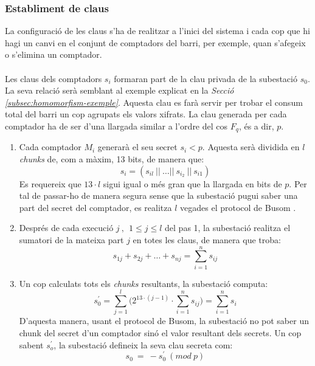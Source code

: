 \documentclass{article}
\begin{document}
\subsubsection{Establiment de claus}\label{section:ks}
La configuració de les claus s'ha de realitzar a l'inici del sistema i cada cop que hi hagi un canvi en el conjunt de comptadors del barri, per exemple, quan s'afegeix o s'elimina un comptador.
\\
\\
Les claus dels comptadors $s_i$ formaran part de la clau privada de la subestació $s_0$. La seva relació serà semblant al exemple explicat en la \textit{Secció \ref{subsec:homomorfism-exemple}}. Aquesta clau es farà servir per trobar el consum total del barri un cop agrupats els valors xifrats.
La clau generada per cada comptador ha de ser d'una llargada similar a l'ordre del cos $F_q$, és a dir, $p$.
\begin{enumerate}
	\item Cada comptador $M_i$ generarà el seu secret $s_i < p$. Aquesta serà dividida en $l$ \textit{chunks} de, com a màxim, 13 bits, de manera que:
	\[s_i = (s_{il}\ ||\ \dots ||\ s_{i_2}\ ||\ s_{i1})\]
	Es requereix que $13 \cdot l$ sigui igual o més gran que la llargada en bits de $p$. Per tal de passar-ho de manera segura sense que la subestació pugui saber una part del secret del comptador, es realitza  $l$ vegades el protocol de Busom \cite{busom}.
	\item Després de cada execució $j \ , \ \ 1 \le j \le l$ del pas 1, la subestació realitza el sumatori de la mateixa part $j$ en totes les claus, de manera que troba:
	\[s_{1j} + s_{2j} + \dots + s_{nj} = \sum_{i=1}^{n} s_{ij}\]
	\item Un cop calculats tots els \textit{chunks} resultants, la subestació computa:
	\[s_0^{'} = \sum_{j=1}^{l} \Big( 2^{13 \cdot (j - 1)} \cdot \sum_{i=1}^{n} s_{ij} \Big) = \sum_{i=1}^{n} s_i\]
	D'aquesta manera, usant el protocol de Busom, la subestació no pot saber un chunk del secret d'un comptador sinó el valor resultant dels secrets. Un cop sabent $s_o^{'}$, la subestació defineix la seva clau secreta com:
	\[s_0\ =\ - s_0^{'} \ (mod \ p)\]
\end{enumerate}
\end{document}
